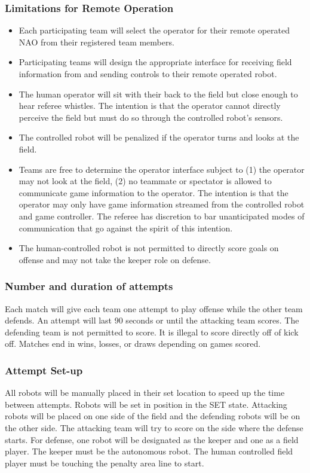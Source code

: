 \subsubsection{Limitations for Remote Operation}
\begin{itemize}
	\item Each participating team will select the operator for their remote operated NAO from their registered team members.
	\item Participating teams will design the appropriate interface for receiving field information from and sending controls to their remote operated robot.
	\item The human operator will sit with their back to the field but close enough to hear referee whistles. The intention is that the operator cannot directly perceive the field but must do so through the controlled robot’s sensors.
	\item The controlled robot will be penalized if the operator turns and looks at the field.
	\item Teams are free to determine the operator interface subject to (1) the operator may not look at the field, (2) no teammate or spectator  is allowed to communicate game information to the operator. The intention is that the operator may only have game information streamed from the controlled robot and game controller. The referee has discretion to bar unanticipated modes of communication that go against the spirit of this intention. 
	\item The human-controlled robot is not permitted to directly score goals on offense and may not take the keeper role on defense.
\end{itemize}

\subsubsection{Number and duration of attempts}
Each match will give each team one attempt to play offense while the other team defends. An attempt will last 90 seconds or until the attacking team scores. The defending team is not permitted to score. It is illegal to score directly off of kick off. Matches end in wins, losses, or draws depending on games scored.

\subsubsection{Attempt Set-up}
All robots will be manually placed in their set location to speed up the time between attempts. Robots will be set in position in the SET state. Attacking robots will be placed on one side of the field and the defending robots will be on the other side. The attacking team will try to score on the side where the defense starts. For defense, one robot will be designated as the keeper and one as a field player. The keeper must be the autonomous robot. The human controlled field player must be touching the penalty area line to start.


